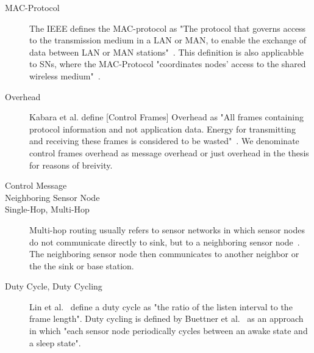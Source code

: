 \begin{description}
    \item[\ac{MAC}-Protocol]
        The \ac{IEEE} defines the \ac{MAC}-protocol as "The protocol that
        governs access to the transmission medium in a LAN or MAN, to enable
        the exchange of data between \ac{LAN} or \ac{MAN}
        stations"~\cite{ieee802}. This definition is also applicabble to
        \acp{SN}, where the \ac{MAC}-Protocol "coordinates nodes' access to the
        shared wireless medium"~\cite{kredo2007hybrid}.

    \item[Overhead]
        Kabara et al. define [Control Frames] Overhead as "All frames
        containing protocol information and not application data. Energy for
        transmitting and receiving these frames is considered to be
        wasted"~\cite{kabara2012mac}. We denominate control frames overhead as
        message overhead or just overhead in the thesis for reasons of
        breivity.

    \item[Control Message]
        

    \item[Neighboring Sensor Node]
        

    \item[Single-Hop, Multi-Hop]
        Multi-hop routing usually refers to sensor networks in which sensor
        nodes do not communicate directly to sink, but to a neighboring sensor
        node~\cite{yaacoub2012multihop}. The neighboring sensor node then
        communicates to another neighbor or the the sink or base station.

    \item[Duty Cycle, Duty Cycling]
        Lin et al.~\cite{lin2004medium} define a duty cycle as "the ratio of
        the listen interval to the frame length". Duty cycling is defined by
        Buettner et al.~\cite{buettner2006x} as an approach in which "each
        sensor node periodically cycles between an awake state and a sleep
        state".



\end{description}
